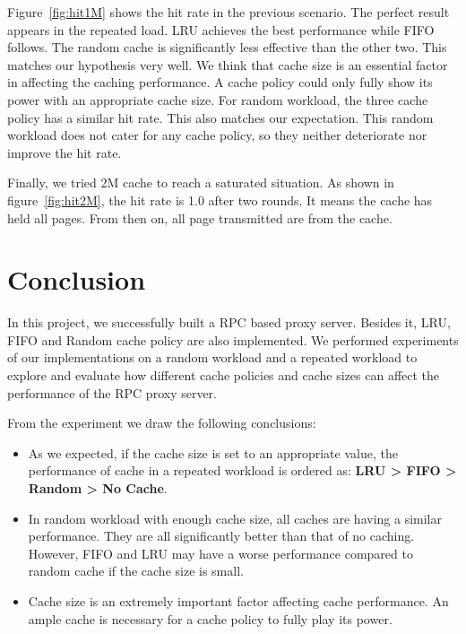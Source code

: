 \documentclass[paper=a4, fontsize=11pt]{scrartcl} %
\numberwithin{equation}{section} %
\numberwithin{figure}{section} %
\numberwithin{table}{section} %
\begin{document}
\vspace{0.5em}

Figure~\ref{fig:hit1M} shows the hit rate in the previous scenario. The perfect result appears in the repeated load. LRU achieves the best performance while FIFO follows. The random cache is significantly less effective than the other two. This matches our hypothesis very well. We think that cache size is an essential factor in affecting the caching performance. A cache policy could only fully show its power with an appropriate cache size. For random workload, the three cache policy has a similar hit rate. This also matches our expectation. This random workload does not cater for any cache policy, so they neither deteriorate nor improve the hit rate. 

\vspace{0.5em}

Finally, we tried 2M cache to reach a saturated situation. 
As shown in figure~\ref{fig:hit2M}, the hit rate is 1.0 after two rounds. It means the cache has held all pages. From then on, all page transmitted are from the cache. 


\section{Conclusion}
In this project, we successfully built a RPC based proxy server. Besides it, LRU, FIFO and Random cache policy are also implemented. We performed experiments of our implementations on a random workload and a repeated workload to explore and evaluate how different cache policies and cache sizes can affect the performance of the RPC proxy server. 

\vspace{1em}

From the experiment we draw the following conclusions:
\begin{itemize}
\item As we expected, if the cache size is set to an appropriate value, the 
  performance of cache in a repeated workload is ordered as:
  \textbf{LRU > FIFO > Random > No Cache}.
\item In random workload with enough cache size, all caches are having a similar performance. They are all significantly better than that of no caching. However, FIFO and LRU may have a worse performance compared to random cache if the cache size is small. 
\item Cache size is an extremely important factor affecting cache performance. An ample cache is necessary for a cache policy to fully play its power.
\end{itemize}
\end{document}
